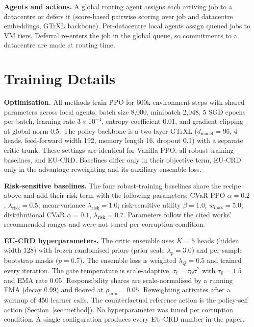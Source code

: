 \documentclass{article} %
\begin{document}
\textbf{Agents and actions.} A global routing agent assigns each arriving job to a datacentre or defers it (score-based pairwise scoring over job and datacentre embeddings, GTrXL backbone). Per-datacentre local agents assign queued jobs to VM tiers. Deferral re-enters the job in the global queue, so commitments to a datacentre are made at routing time.

\section{Training Details}
\label{app:training}

\textbf{Optimisation.} All methods train PPO for 600k environment steps with shared parameters across local agents, batch size 8{,}000, minibatch 2{,}048, 5 SGD epochs per batch, learning rate $3\times10^{-4}$, entropy coefficient 0.01, and gradient clipping at global norm 0.5. The policy backbone is a two-layer GTrXL ($d_{\text{model}}=96$, 4 heads, feed-forward width 192, memory length 16, dropout 0.1) with a separate critic trunk. These settings are identical for Vanilla PPO, all robust-training baselines, and EU-CRD. Baselines differ only in their objective term, EU-CRD only in the advantage reweighting and its auxiliary ensemble loss.

\textbf{Risk-sensitive baselines.} The four robust-training baselines share the recipe above and add their risk term with the following parameters: CVaR-PPO $\alpha{=}0.2$, $\lambda_{\text{risk}}{=}0.5$; mean-variance $\lambda_{\text{risk}}{=}1.0$; risk-sensitive utility $\beta{=}1.0$, $w_{\max}{=}5.0$; distributional CVaR $\alpha{=}0.1$, $\lambda_{\text{risk}}{=}0.7$. Parameters follow the cited works' recommended ranges and were not tuned per corruption condition.

\textbf{EU-CRD hyperparameters.} The critic ensemble uses $K=5$ heads (hidden width 128) with frozen randomised priors (prior scale $\lambda_p=3.0$) and per-sample bootstrap masks ($p=0.7$). The ensemble loss is weighted $\lambda_Q{=}0.5$ and trained every iteration. The gate temperature is scale-adaptive, $\tau_t=\tau_0\bar\sigma^2$ with $\tau_0=1.5$ and EMA rate 0.05. Responsibility shares are scale-normalised by a running EMA (decay 0.99) and floored at $\rho_{\min}=0.05$. Reweighting activates after a warmup of 450 learner calls. The counterfactual reference action is the policy-self action (Section~\ref{sec:method}). No hyperparameter was tuned per corruption condition. A single configuration produces every EU-CRD number in the paper.
\end{document}
